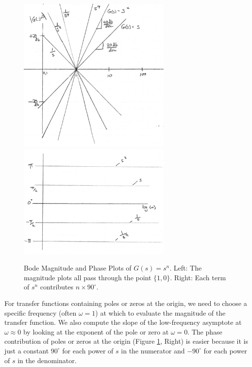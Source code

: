 \begin{figure}\centering
\includegraphics[width=3.0in]{figs05/00761a.png}
\includegraphics[width=3.0in]{figs05/00762a.png}
\caption{Bode Magnitude and Phase Plots of $G(s) = s^n$.  Left: The magnitude plots all pass through the point $\{1,0\}$. Right: Each term of $s^n$ contributes $n\times90^\circ$.}\label{bodepolesatorigin}
\end{figure}
%

For transfer functions containing poles or zeros at the origin, we need to choose a specific frequency (often $\omega=1$) at which to evaluate the magnitude of the transfer function.   We also compute the slope of the low-frequency asymptote at $\omega \approx 0$ by looking at the exponent of the pole or zero at $\omega=0$.  The phase contribution of poles or zeros at the origin (Figure \ref{bodepolesatorigin}, Right) is easier because it is just a constant $90^\circ$ for each power of $s$ in the numerator and $-90^\circ$ for each power of $s$ in the denominator.


